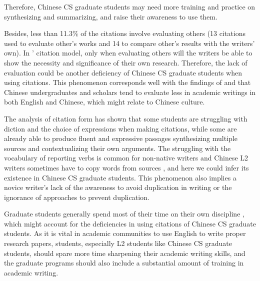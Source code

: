 Therefore, Chinese CS graduate students may need more training and practice on synthesizing and summarizing, and raise their awareness to use them.

Besides, less than 11.3\% of the citations involve evaluating others (13 citations used to evaluate other’s works and 14 to compare other’s results with the writers’ own). In \citeauthor{swales_genre_1990}’ \citeyearpar{swales_genre_1990} citation model, only when evaluating others will the writers be able to show the necessity and significance of their own research. Therefore, the lack of evaluation could be another deficiency of Chinese CS graduate students when using citations. This phenomenon corresponds well with the findings of \citet{hyland_authority_2002} and \citet{liu_attitude_2009} that Chinese undergraduates and scholars tend to evaluate less in academic writings in both English and Chinese, which might relate to Chinese culture.

The analysis of citation form has shown that some students are struggling with diction and the choice of expressions when making citations, while some are already able to produce fluent and expressive passages synthesizing multiple sources and contextualizing their own arguments. The struggling with the vocabulary of reporting verbs is common for non-native writers \citep{schmitt_writing_2007,thompson_evaluation_1991} and Chinese L2 writers sometimes have to copy words from sources \citep{shi_textual_2004}, and here we could infer its existence in Chinese CS graduate students. This phenomenon also implies a novice writer’s lack of the awareness to avoid duplication in writing or the ignorance of approaches to prevent duplication.

Graduate students generally spend most of their time on their own discipline \citep{davis_development_2013}, which might account for the deficiencies in using citations of Chinese CS graduate students. As it is vital in academic communities to use English to write proper research papers, students, especially L2 students like Chinese CS graduate students, should spare more time sharpening their academic writing skills, and the graduate programs should also include a substantial amount of training in academic writing.